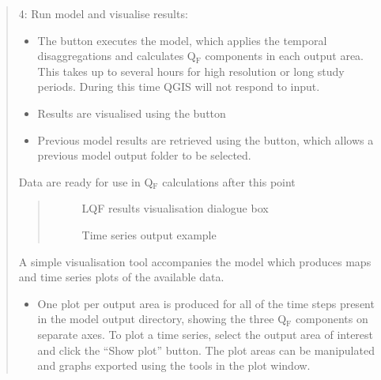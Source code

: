 \documentclass[letterpaper,10pt,english]{sphinxmanual}
\begin{document}
\begin{quote}
\begin{itemize}
\begin{itemize}
\end{itemize}

\end{itemize}

4: Run model and visualise results:
\begin{itemize}
\item {} 
The  button executes the model, which applies the temporal disaggregations and calculates Q$_{\text{F}}$ components in each output area. This takes up to several hours for high resolution or long study periods. During this time QGIS will not respond to input.

\item {} 
Results are visualised using the  button

\item {} 
Previous model results are retrieved using the  button, which allows a previous model output folder to be selected.

\end{itemize}

Data are ready for use in Q$_{\text{F}}$ calculations after this point

\begin{quote}

\begin{figure}[htbp]
\centering
\capstart

\noindent{}
\caption{LQF results visualisation dialogue box}\label{\detokenize{OtherManuals/LQF_Manual:id2}}\end{figure}

\begin{figure}[htbp]
\centering
\capstart

\noindent{}
\caption{Time series output example}\label{\detokenize{OtherManuals/LQF_Manual:id3}}\end{figure}
\end{quote}

A simple visualisation tool accompanies the model which produces maps and time series plots of the available data.

\begin{itemize}
\item {} 
One plot per output area is produced for all of the time steps present in the model output directory, showing the three Q$_{\text{F}}$ components on separate axes. To plot a time series, select the output area of interest and click the “Show plot” button. The plot areas can be manipulated and graphs exported using the tools in the plot window.


\end{itemize}
\end{quote}
\end{document}
